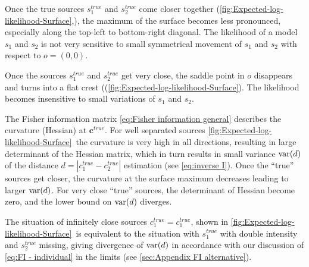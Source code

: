 Once the true sources $s_1^{true}$ and $s_2^{true}$ come closer together (\autoref{fig:Expected-log-likelihood-Surface}\bbb,\ccc), the maximum of the surface becomes less pronounced, especially along the top-left to bottom-right diagonal. The likelihood of a model $s_1$ and $s_2$ is not very sensitive to small symmetrical movement of $s_1$ and $s_2$ with respect to $o=(0,0)$. 

Once the sources $s_1^{true}$ and $s_2^{true}$ get very close, the saddle point in $o$ disappears and turns into a flat crest ((\autoref{fig:Expected-log-likelihood-Surface}\ddd). The likelihood becomes insensitive to small variations of $s_1$ and $s_2$. 

The Fisher information matrix \autoref{eq:Fisher information general} describes the curvature (Hessian) at $\bm{c}^{true}$. For well separated sources \autoref{fig:Expected-log-likelihood-Surface}\aaa\ the curvature is very high in all directions, resulting in large determinant of the Hessian matrix, which in turn results in small variance $\mathrm{var}(d)$ of the distance $d=\left|c_1^{true}-c_2^{true}\right|$ estimation  (see \autoref{eq:inverse I}). Once the ``true'' sources get closer, the curvature at the surface maximum decreases leading to larger $\mathrm{var}(d)$. For very close ``true'' sources, the determinant of Hessian become zero, and the lower bound on $\mathrm{var}(d)$ diverges. 

The situation of infinitely close sources $c_1^{true}=c_1^{true}$, shown in \autoref{fig:Expected-log-likelihood-Surface}\ddd\  is equivalent to the situation with $s_1^{true}$ with double intensity and $s_2^{true}$ missing, giving divergence of $\mathrm{var}(d)$ in accordance with our discussion of \autoref{eq:FI - individual} in the limits  (see \autoref{sec:Appendix FI alternative}).


